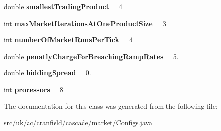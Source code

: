 \begin{DoxyCompactItemize}
\item 
\hypertarget{classuk_1_1ac_1_1cranfield_1_1cascade_1_1market_1_1_configs_a4b8ec42613b8b06323e8bb2cf5c598f3}{double {\bfseries smallest\-Trading\-Product} = 4}\label{classuk_1_1ac_1_1cranfield_1_1cascade_1_1market_1_1_configs_a4b8ec42613b8b06323e8bb2cf5c598f3}

\item 
\hypertarget{classuk_1_1ac_1_1cranfield_1_1cascade_1_1market_1_1_configs_a31fa42b20ab765a4546e62dc5fe18c5c}{int {\bfseries max\-Market\-Iterations\-At\-One\-Product\-Size} = 3}\label{classuk_1_1ac_1_1cranfield_1_1cascade_1_1market_1_1_configs_a31fa42b20ab765a4546e62dc5fe18c5c}

\item 
\hypertarget{classuk_1_1ac_1_1cranfield_1_1cascade_1_1market_1_1_configs_ab1257918396b24aeee1257cc528dcfff}{int {\bfseries number\-Of\-Market\-Runs\-Per\-Tick} = 4}\label{classuk_1_1ac_1_1cranfield_1_1cascade_1_1market_1_1_configs_ab1257918396b24aeee1257cc528dcfff}

\item 
\hypertarget{classuk_1_1ac_1_1cranfield_1_1cascade_1_1market_1_1_configs_a6273ca9ab00789a4e468788c81f6abae}{double {\bfseries penatly\-Charge\-For\-Breaching\-Ramp\-Rates} = 5.}\label{classuk_1_1ac_1_1cranfield_1_1cascade_1_1market_1_1_configs_a6273ca9ab00789a4e468788c81f6abae}

\item 
\hypertarget{classuk_1_1ac_1_1cranfield_1_1cascade_1_1market_1_1_configs_a5b60f19abefa04e84cde52201aafb08c}{double {\bfseries bidding\-Spread} = 0.}\label{classuk_1_1ac_1_1cranfield_1_1cascade_1_1market_1_1_configs_a5b60f19abefa04e84cde52201aafb08c}

\item 
\hypertarget{classuk_1_1ac_1_1cranfield_1_1cascade_1_1market_1_1_configs_a1921f9491f87cb2d76b425d2adae26cc}{int {\bfseries processors} = 8}\label{classuk_1_1ac_1_1cranfield_1_1cascade_1_1market_1_1_configs_a1921f9491f87cb2d76b425d2adae26cc}

\end{DoxyCompactItemize}


The documentation for this class was generated from the following file\-:\begin{DoxyCompactItemize}
\item 
src/uk/ac/cranfield/cascade/market/Configs.\-java\end{DoxyCompactItemize}
